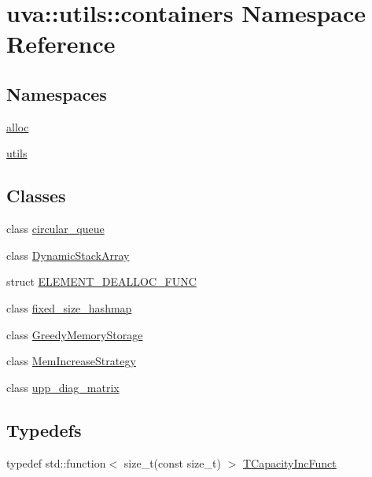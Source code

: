 \hypertarget{namespaceuva_1_1utils_1_1containers}{}\section{uva\+:\+:utils\+:\+:containers Namespace Reference}
\label{namespaceuva_1_1utils_1_1containers}
\subsection*{Namespaces}
\begin{DoxyCompactItemize}
\item 
 \hyperlink{namespaceuva_1_1utils_1_1containers_1_1alloc}{alloc}
\item 
 \hyperlink{namespaceuva_1_1utils_1_1containers_1_1utils}{utils}
\end{DoxyCompactItemize}
\subsection*{Classes}
\begin{DoxyCompactItemize}
\item 
class \hyperlink{classuva_1_1utils_1_1containers_1_1circular__queue}{circular\+\_\+queue}
\item 
class \hyperlink{classuva_1_1utils_1_1containers_1_1_dynamic_stack_array}{Dynamic\+Stack\+Array}
\item 
struct \hyperlink{structuva_1_1utils_1_1containers_1_1_e_l_e_m_e_n_t___d_e_a_l_l_o_c___f_u_n_c}{E\+L\+E\+M\+E\+N\+T\+\_\+\+D\+E\+A\+L\+L\+O\+C\+\_\+\+F\+U\+N\+C}
\item 
class \hyperlink{classuva_1_1utils_1_1containers_1_1fixed__size__hashmap}{fixed\+\_\+size\+\_\+hashmap}
\item 
class \hyperlink{classuva_1_1utils_1_1containers_1_1_greedy_memory_storage}{Greedy\+Memory\+Storage}
\item 
class \hyperlink{classuva_1_1utils_1_1containers_1_1_mem_increase_strategy}{Mem\+Increase\+Strategy}
\item 
class \hyperlink{classuva_1_1utils_1_1containers_1_1upp__diag__matrix}{upp\+\_\+diag\+\_\+matrix}
\end{DoxyCompactItemize}
\subsection*{Typedefs}
\begin{DoxyCompactItemize}
\item 
typedef std\+::function$<$ size\+\_\+t(const size\+\_\+t) $>$ \hyperlink{namespaceuva_1_1utils_1_1containers_ab6acd1b6093503e17f6d8b942e9fccf1}{T\+Capacity\+Inc\+Funct}
\end{DoxyCompactItemize}
